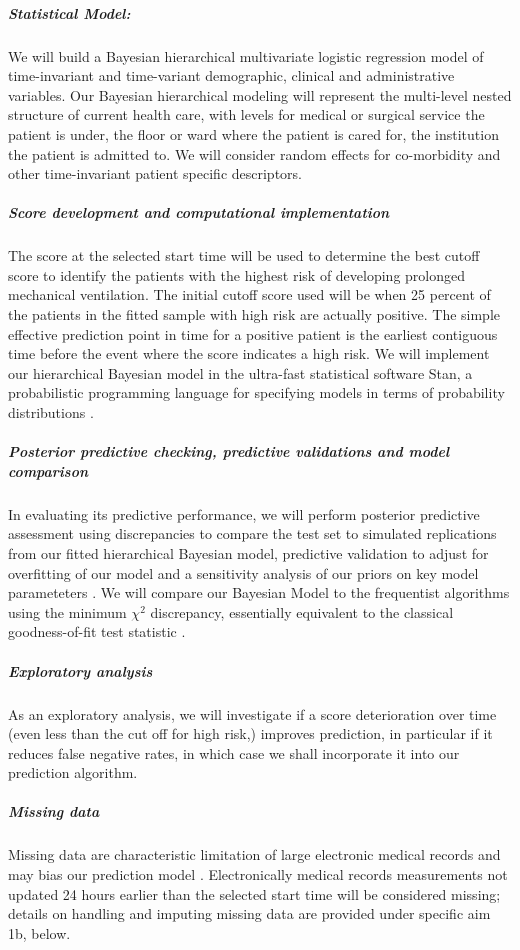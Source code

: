 \documentclass[11pt,notitlepage]{article}
\begin{document}
\subparagraph*{Statistical Model:}
We will build a Bayesian hierarchical multivariate logistic regression model of time-invariant and time-variant demographic, clinical  and administrative variables. Our Bayesian hierarchical modeling will represent the multi-level nested structure of current health care, with levels for medical or surgical service the patient is under, the floor or ward where the patient is cared for, the institution the patient is admitted to. We will consider random effects for co-morbidity and other time-invariant patient specific descriptors. 

\subparagraph*{Score development and computational implementation}
The score at the selected start time will be used to determine the best cutoff score to identify the patients with the highest risk of developing prolonged mechanical ventilation. The initial cutoff score used will be when 25 percent of the patients in the fitted sample with high risk are actually positive. The simple effective prediction point in time for a positive patient is the earliest contiguous time before the event where the score indicates a high risk. We will implement our hierarchical Bayesian model in the ultra-fast statistical software Stan, a probabilistic programming language for specifying models in terms of probability distributions \cite{Stan_Software_2014}. 

\subparagraph*{Posterior predictive checking, predictive validations and model comparison}
In evaluating its predictive performance, we will perform posterior predictive assessment using discrepancies \cite{GelmanMengStern1996} to compare the test set to simulated replications from our fitted hierarchical Bayesian model, predictive validation to adjust for overfitting of our model and a sensitivity analysis of our priors on key model parameteters \cite{Gelman-Hill_2014,Gelman_predictive_2000}. We will compare our Bayesian Model to the frequentist algorithms using the minimum $\chi^{2}$ discrepancy, essentially equivalent to the classical
goodness-of-fit test statistic \cite{GelmanMengStern1996}.

\subparagraph{Exploratory analysis}
As an exploratory analysis, we will investigate if a score deterioration over time (even less than the cut off for high risk,) improves prediction, in particular if it reduces false negative rates, in which case we shall incorporate it into our prediction algorithm.

\subparagraph*{Missing data}
Missing data are characteristic limitation of large electronic medical records and may bias our prediction model \cite{Dean_19279318}. Electronically medical records measurements not updated 24 hours earlier than the selected start time will be considered missing; details on handling and imputing missing data are provided under specific aim 1b, below. 
\end{document}
